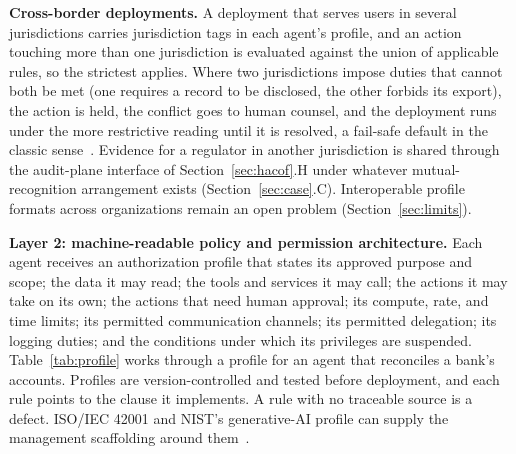 \documentclass{ieeeaccess}
\begin{document}
\textbf{Cross-border deployments.} A deployment that serves users in several jurisdictions carries jurisdiction tags in each agent's profile, and an action touching more than one jurisdiction is evaluated against the union of applicable rules, so the strictest applies. Where two jurisdictions impose duties that cannot both be met (one requires a record to be disclosed, the other forbids its export), the action is held, the conflict goes to human counsel, and the deployment runs under the more restrictive reading until it is resolved, a fail-safe default in the classic sense~\cite{saltzer1975protection}.
Evidence for a regulator in another jurisdiction is shared through the audit-plane interface of Section~\ref{sec:hacof}.H under whatever mutual-recognition arrangement exists (Section~\ref{sec:case}.C). Interoperable profile formats across organizations remain an open problem (Section~\ref{sec:limits}).

\textbf{Layer 2: machine-readable policy and permission architecture.} Each agent receives an authorization profile that states its approved purpose and scope; the data it may read; the tools and services it may call; the actions it may take on its own; the actions that need human approval; its compute, rate, and time limits; its permitted communication channels; its permitted delegation; its logging duties; and the conditions under which its privileges are suspended. Table~\ref{tab:profile} works through a profile for an agent that reconciles a bank's accounts. Profiles are version-controlled and tested before deployment, and each rule points to the clause it implements. A rule with no traceable source is a defect. ISO/IEC 42001 and NIST's generative-AI profile can supply the management scaffolding around them~\cite{iso2023iso42001,nist2024genai}.
\end{document}

